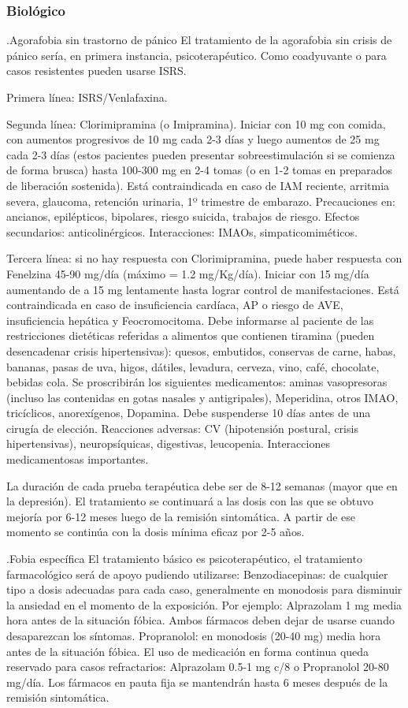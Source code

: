 \subsubsection*{Biológico}
.Agorafobia sin trastorno de pánico
El tratamiento de la agorafobia sin crisis de pánico sería, en primera instancia, psicoterapéutico. Como coadyuvante o para casos resistentes pueden usarse ISRS.

Primera línea: ISRS/Venlafaxina.

Segunda línea: Clorimipramina (o Imipramina). Iniciar con 10 mg con comida, con aumentos progresivos de 10 mg cada 2-3 días y luego aumentos de 25 mg cada 2-3 días (estos pacientes pueden presentar sobreestimulación si se comienza de forma brusca) hasta 100-300 mg en 2-4 tomas (o en 1-2 tomas en preparados de liberación sostenida). Está contraindicada en caso de IAM reciente, arritmia severa, glaucoma, retención urinaria, 1º trimestre de embarazo. Precauciones en: ancianos, epilépticos, bipolares, riesgo suicida, trabajos de riesgo. Efectos secundarios: anticolinérgicos. Interacciones: IMAOs, simpaticomiméticos.

Tercera línea: si no hay respuesta con Clorimipramina, puede haber respuesta con Fenelzina 45-90 mg/día (máximo = 1.2 mg/Kg/día). Iniciar con 15 mg/día aumentando de a 15 mg lentamente hasta lograr control de manifestaciones. Está contraindicada en caso de insuficiencia cardíaca, AP o riesgo de AVE, insuficiencia hepática y Feocromocitoma. Debe informarse al paciente de las restricciones dietéticas referidas a alimentos que contienen tiramina (pueden desencadenar crisis hipertensivas): quesos, embutidos, conservas de carne, habas, bananas, pasas de uva, higos, dátiles, levadura, cerveza, vino, café, chocolate, bebidas cola. Se proscribirán los siguientes medicamentos: aminas vasopresoras (incluso las contenidas en gotas nasales y antigripales), Meperidina, otros IMAO, tricíclicos, anorexígenos, Dopamina. Debe suspenderse 10 días antes de una cirugía de elección. Reacciones adversas: CV (hipotensión postural, crisis hipertensivas), neuropsíquicas, digestivas, leucopenia. Interacciones medicamentosas importantes.

La duración de cada prueba terapéutica debe ser de 8-12 semanas (mayor que en la depresión). El tratamiento se continuará a las dosis con las que se obtuvo mejoría por 6-12 meses luego de la remisión sintomática. A partir de ese momento se continúa con la dosis mínima eficaz por 2-5 años.

.Fobia específica
El tratamiento básico es psicoterapéutico, el tratamiento farmacológico será de apoyo pudiendo utilizarse: Benzodiacepinas: de cualquier tipo a dosis adecuadas para cada caso, generalmente en monodosis para disminuir la ansiedad en el momento de la exposición. Por ejemplo: Alprazolam 1 mg media hora antes de la situación fóbica. Ambos fármacos deben dejar de usarse cuando desaparezcan los síntomas. Propranolol: en monodosis (20-40 mg) media hora antes de la situación fóbica. El uso de medicación en forma continua queda reservado para casos refractarios: Alprazolam 0.5-1 mg c/8 o Propranolol 20-80 mg/día. Los fármacos en pauta fija se mantendrán hasta 6 meses después de la remisión sintomática.

